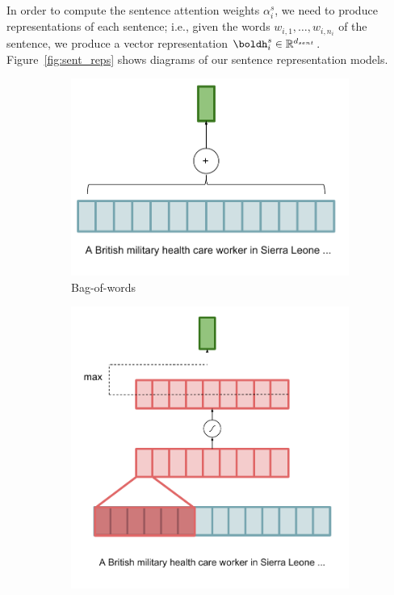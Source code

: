 \documentclass[12pt]{report}
\begin{document}
In order to compute the sentence attention weights $\alpha_i^s$, we need to produce representations of each sentence; i.e., given the words $w_{i,1}, \ldots, w_{i, n_i}$ of the sentence, we produce a vector representation $\boldh^s_i \in \mathbb{R}^{d_{sent}}$. Figure~\ref{fig:sent_reps} shows diagrams of our sentence representation models.

\begin{figure}[t]
\centering
\begin{subfigure}{0.45\textwidth}
	\includegraphics[width=\textwidth]{images/bow_encoder_bow}
  \caption[Bag of Words Encoder]{Bag-of-words}
	\label{fig:bow_encoder_bow}
\end{subfigure}
\begin{subfigure}{0.45\textwidth}
	\includegraphics[width=\textwidth]{images/bow_encoder_conv}

\end{subfigure}
\end{figure}
\end{document}

